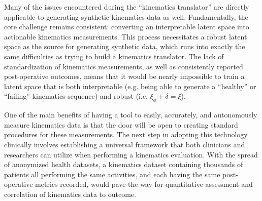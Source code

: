 Many of the issues encountered during the ``kinematics translator'' are directly applicable to generating synthetic kinematics data as well.
Fundamentally, the core challenge remains consistent: converting an interpretable latent space into actionable kinematics measurements.
This process necessitates a robust latent space as the source for generating synthetic data, which runs into exactly the same difficulties as trying to build a kinematics translator.
The lack of standardization of kinematics measurements, as well as consistently reported post-operative outcomes, means that it would be nearly impossible to train a latent space that is both interpretable (e.g. being able to generate a ``healthy'' or ``failing'' kinematics sequence) and robust (i.e. $\xi_{\phi} \pm \delta = \xi$).

One of the main benefits of having a tool to easily, accurately, and autonomously measure kinematics data is that the door will be open to creating standard procedures for these measurements.
The next step in adopting this technology clinically involves establishing a universal framework that both clinicians and researchers can utilize when performing a kinematics evaluation.
With the spread of anonymized health datasets, a kinematics dataset containing thousands of patients all performing the same activities, and each having the same post-operative metrics recorded, would pave the way for quantitative assessment and correlation of kinematics data to outcome.


